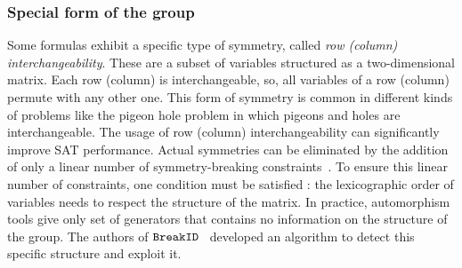 %
\subsubsection{Special form of the group} \label{sec:matrix-sbp}
Some formulas exhibit a specific type of symmetry, called \emph{row (column) interchangeability}. These are
a subset of variables structured as a two-dimensional matrix. Each row (column) is interchangeable,
so, all variables of a row (column) permute with any other one.
This form of symmetry is common in different kinds of problems like the pigeon hole problem in which
pigeons and holes are interchangeable. %
The usage of row (column) interchangeability can significantly improve SAT performance. 
Actual symmetries can be eliminated by the addition 
of only a linear number of symmetry-breaking constraints~\cite{flener2002breaking}. 
To ensure this linear number of constraints, one condition must be satisfied :
the lexicographic order of variables needs to respect the structure of the matrix.
In practice, automorphism tools give only  set of generators that contains no information on
the structure of the group. 
The authors of $\texttt{BreakID}$~\cite{devriendt2016improved} developed an algorithm to detect this specific 
structure and exploit it.
